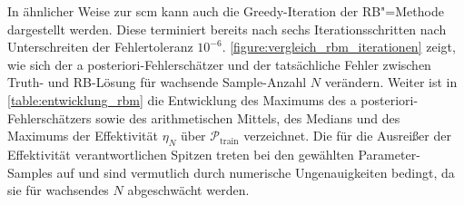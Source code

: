 \documentclass[../main.tex]{subfiles}
\begin{document}
In ähnlicher Weise zur \ac{scm} kann auch die Greedy-Iteration der RB"=Methode dargestellt werden.
Diese terminiert bereits nach sechs Iterationsschritten nach Unterschreiten der Fehlertoleranz $10^{-6}$.
\cref{figure:vergleich_rbm_iterationen} zeigt, wie sich der a posteriori-Fehlerschätzer und der tatsächliche Fehler zwischen Truth- und RB-Lösung für wachsende Sample-Anzahl $N$ verändern.
Weiter ist in \cref{table:entwicklung_rbm} die Entwicklung des Maximums des a posteriori-Fehlerschätzers sowie des arithmetischen Mittels, des Medians und des Maximums der Effektivität $\eta_{N}$ über $\mathcal P_{\mathrm{train}}$ verzeichnet.
Die für die Ausreißer der Effektivität verantwortlichen Spitzen treten bei den gewählten Parameter-Samples auf und sind vermutlich durch numerische Ungenauigkeiten bedingt, da sie für wachsendes $N$ abgeschwächt werden.
\end{document}
